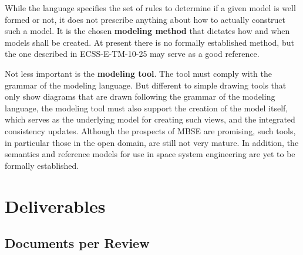 While the language specifies the set of rules to determine if a given model is well formed or not, it does not prescribe anything about how to actually construct such a model. It is the chosen \textbf{modeling method} that dictates how and when models shall be created. At present there is no formally established method, but the one described in ECSS-E-TM-10-25 \cite{ECSS-E-TM-10-25} may serve as a good reference.

Not less important is the \textbf{modeling tool}. The tool must comply with the grammar of the modeling language. But different to simple drawing tools that only show diagrams that are drawn following the grammar of the modeling language, the modeling tool must also support the creation of the model itself, which serves as the underlying model for creating such views, and the integrated consistency updates. Although the prospects of MBSE are promising, such tools, in particular those in the open domain, are still not very mature. In addition, the semantics and reference models for use in space system engineering are yet to be formally established.

\clearpage
\section{Deliverables}

\subsection{Documents per Review}

